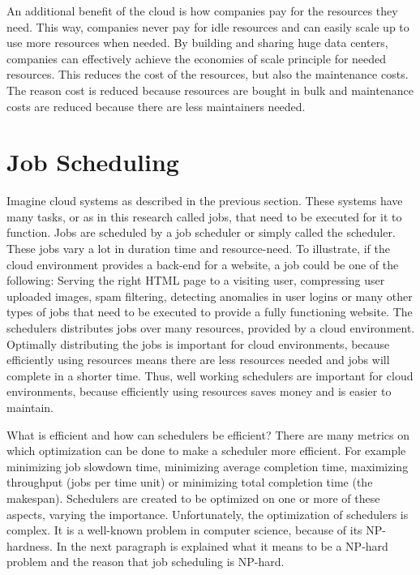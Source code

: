 An additional benefit of the cloud is how companies pay for the resources they
need. This way, companies never pay for idle resources and can easily scale up
to use more resources when needed. By building and sharing huge data centers,
companies can effectively achieve the economies of scale principle for needed
resources. This reduces the cost of the resources, but also the maintenance
costs. The reason cost is reduced because resources are bought in bulk and
maintenance costs are reduced because there are less maintainers needed.


\section{Job Scheduling}\label{sec:scheduling}

Imagine cloud systems as described in the previous section. These systems have
many tasks, or as in this research called jobs, that need to be executed for
it to function. Jobs are scheduled by a job scheduler or simply called the
scheduler. These jobs vary a lot in duration time and resource-need. To
illustrate, if the cloud environment provides a back-end for a website, a job
could be one of the following: Serving the right HTML page to a visiting user,
compressing user uploaded images, spam filtering, detecting anomalies in user
logins or many other types of jobs that need to be executed to provide a fully
functioning website. The schedulers distributes jobs over many resources,
provided by a cloud environment. Optimally distributing the jobs is important
for cloud environments, because efficiently using resources means there are
less resources needed and jobs will complete in a shorter time. Thus, well
working schedulers are important for cloud environments, because efficiently
using resources saves money and is easier to maintain.

What is efficient and how can schedulers be efficient? There are many metrics
on which optimization can be done to make a scheduler more efficient. For
example minimizing job slowdown time, minimizing average completion time,
maximizing throughput (jobs per time unit) or minimizing total completion time
(the makespan). Schedulers are created to be optimized on one or more of these
aspects, varying the importance. Unfortunately, the optimization of schedulers
is complex. It is a well-known problem in computer science, because of its
NP-hardness. In the next paragraph is explained what it means to be a NP-hard
problem and the reason that job scheduling is NP-hard.


